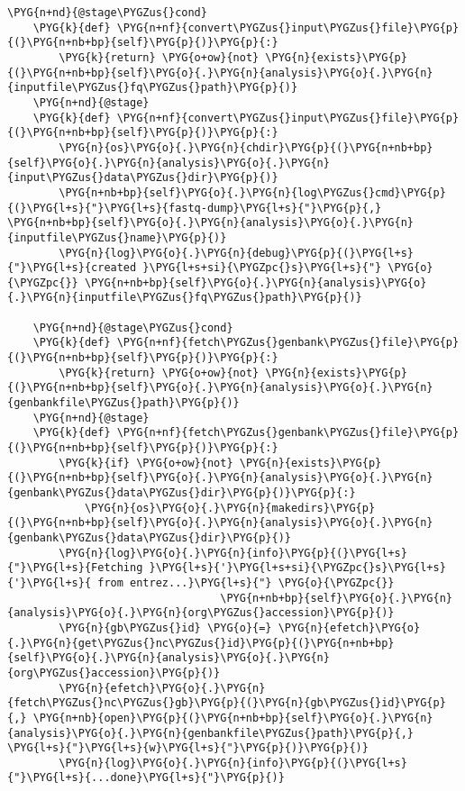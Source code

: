 \begin{Verbatim}[commandchars=\\\{\}]
    \PYG{n+nd}{@stage\PYGZus{}cond}
    \PYG{k}{def} \PYG{n+nf}{convert\PYGZus{}input\PYGZus{}file}\PYG{p}{(}\PYG{n+nb+bp}{self}\PYG{p}{)}\PYG{p}{:}
        \PYG{k}{return} \PYG{o+ow}{not} \PYG{n}{exists}\PYG{p}{(}\PYG{n+nb+bp}{self}\PYG{o}{.}\PYG{n}{analysis}\PYG{o}{.}\PYG{n}{inputfile\PYGZus{}fq\PYGZus{}path}\PYG{p}{)}
    \PYG{n+nd}{@stage}
    \PYG{k}{def} \PYG{n+nf}{convert\PYGZus{}input\PYGZus{}file}\PYG{p}{(}\PYG{n+nb+bp}{self}\PYG{p}{)}\PYG{p}{:}
        \PYG{n}{os}\PYG{o}{.}\PYG{n}{chdir}\PYG{p}{(}\PYG{n+nb+bp}{self}\PYG{o}{.}\PYG{n}{analysis}\PYG{o}{.}\PYG{n}{input\PYGZus{}data\PYGZus{}dir}\PYG{p}{)}
        \PYG{n+nb+bp}{self}\PYG{o}{.}\PYG{n}{log\PYGZus{}cmd}\PYG{p}{(}\PYG{l+s}{"}\PYG{l+s}{fastq-dump}\PYG{l+s}{"}\PYG{p}{,} \PYG{n+nb+bp}{self}\PYG{o}{.}\PYG{n}{analysis}\PYG{o}{.}\PYG{n}{inputfile\PYGZus{}name}\PYG{p}{)}
        \PYG{n}{log}\PYG{o}{.}\PYG{n}{debug}\PYG{p}{(}\PYG{l+s}{"}\PYG{l+s}{created }\PYG{l+s+si}{\PYGZpc{}s}\PYG{l+s}{"} \PYG{o}{\PYGZpc{}} \PYG{n+nb+bp}{self}\PYG{o}{.}\PYG{n}{analysis}\PYG{o}{.}\PYG{n}{inputfile\PYGZus{}fq\PYGZus{}path}\PYG{p}{)}

    \PYG{n+nd}{@stage\PYGZus{}cond}
    \PYG{k}{def} \PYG{n+nf}{fetch\PYGZus{}genbank\PYGZus{}file}\PYG{p}{(}\PYG{n+nb+bp}{self}\PYG{p}{)}\PYG{p}{:}
        \PYG{k}{return} \PYG{o+ow}{not} \PYG{n}{exists}\PYG{p}{(}\PYG{n+nb+bp}{self}\PYG{o}{.}\PYG{n}{analysis}\PYG{o}{.}\PYG{n}{genbankfile\PYGZus{}path}\PYG{p}{)}
    \PYG{n+nd}{@stage}
    \PYG{k}{def} \PYG{n+nf}{fetch\PYGZus{}genbank\PYGZus{}file}\PYG{p}{(}\PYG{n+nb+bp}{self}\PYG{p}{)}\PYG{p}{:}
        \PYG{k}{if} \PYG{o+ow}{not} \PYG{n}{exists}\PYG{p}{(}\PYG{n+nb+bp}{self}\PYG{o}{.}\PYG{n}{analysis}\PYG{o}{.}\PYG{n}{genbank\PYGZus{}data\PYGZus{}dir}\PYG{p}{)}\PYG{p}{:}
            \PYG{n}{os}\PYG{o}{.}\PYG{n}{makedirs}\PYG{p}{(}\PYG{n+nb+bp}{self}\PYG{o}{.}\PYG{n}{analysis}\PYG{o}{.}\PYG{n}{genbank\PYGZus{}data\PYGZus{}dir}\PYG{p}{)}
        \PYG{n}{log}\PYG{o}{.}\PYG{n}{info}\PYG{p}{(}\PYG{l+s}{"}\PYG{l+s}{Fetching }\PYG{l+s}{'}\PYG{l+s+si}{\PYGZpc{}s}\PYG{l+s}{'}\PYG{l+s}{ from entrez...}\PYG{l+s}{"} \PYG{o}{\PYGZpc{}}
                                 \PYG{n+nb+bp}{self}\PYG{o}{.}\PYG{n}{analysis}\PYG{o}{.}\PYG{n}{org\PYGZus{}accession}\PYG{p}{)}
        \PYG{n}{gb\PYGZus{}id} \PYG{o}{=} \PYG{n}{efetch}\PYG{o}{.}\PYG{n}{get\PYGZus{}nc\PYGZus{}id}\PYG{p}{(}\PYG{n+nb+bp}{self}\PYG{o}{.}\PYG{n}{analysis}\PYG{o}{.}\PYG{n}{org\PYGZus{}accession}\PYG{p}{)}
        \PYG{n}{efetch}\PYG{o}{.}\PYG{n}{fetch\PYGZus{}nc\PYGZus{}gb}\PYG{p}{(}\PYG{n}{gb\PYGZus{}id}\PYG{p}{,} \PYG{n+nb}{open}\PYG{p}{(}\PYG{n+nb+bp}{self}\PYG{o}{.}\PYG{n}{analysis}\PYG{o}{.}\PYG{n}{genbankfile\PYGZus{}path}\PYG{p}{,} \PYG{l+s}{"}\PYG{l+s}{w}\PYG{l+s}{"}\PYG{p}{)}\PYG{p}{)}
        \PYG{n}{log}\PYG{o}{.}\PYG{n}{info}\PYG{p}{(}\PYG{l+s}{"}\PYG{l+s}{...done}\PYG{l+s}{"}\PYG{p}{)}


\end{Verbatim}
